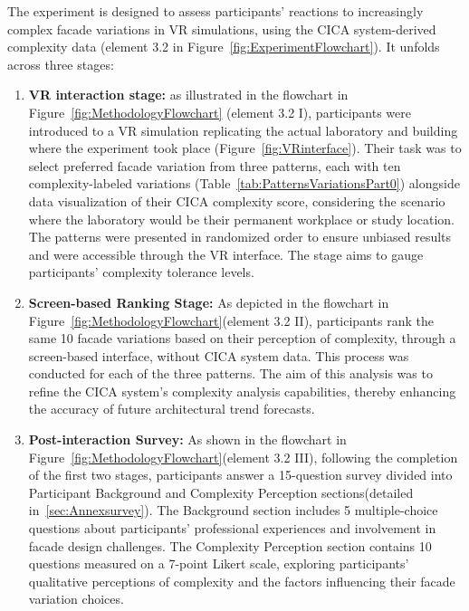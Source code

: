 %    


The experiment is designed to assess participants' reactions to increasingly complex facade variations in VR simulations, using the CICA system-derived complexity data (element 3.2 in Figure~\ref{fig:ExperimentFlowchart}). It unfolds across three stages:

\begin{enumerate}
    \item \textbf{VR interaction stage:}  as illustrated in the flowchart in Figure~\ref{fig:MethodologyFlowchart} (element 3.2 I), participants were introduced to a VR simulation replicating the actual laboratory and building where the experiment took place (Figure~\ref{fig:VRinterface}).
    Their task was to select preferred facade variation from three patterns, each with ten complexity-labeled variations (Table~\ref{tab:PatternsVariationsPart0}) alongside data visualization of their CICA complexity score, considering the scenario where the laboratory would be their permanent workplace or study location.
    The patterns were presented in randomized order to ensure unbiased results and were accessible through the VR interface.
    The stage aims to gauge participants' complexity tolerance levels.
    \item \textbf{Screen-based Ranking Stage:} As depicted in the flowchart in Figure~\ref{fig:MethodologyFlowchart}(element 3.2 II), participants rank the same 10 facade variations based on their perception of complexity, through a screen-based interface, without CICA system data.
    This process was conducted for each of the three patterns.
    The aim of this analysis was to refine the CICA system's complexity analysis capabilities, thereby enhancing the accuracy of future architectural trend forecasts.
    \item \textbf{Post-interaction Survey:} As shown in the flowchart in Figure~\ref{fig:MethodologyFlowchart}(element 3.2 III), following the completion of the first two stages, participants answer a 15-question survey divided into Participant Background and Complexity Perception sections(detailed in~\ref{sec:Annexsurvey}).
    The Background section includes 5 multiple-choice questions about participants' professional experiences and involvement in facade design challenges.
    The Complexity Perception section contains 10 questions measured on a 7-point Likert scale, exploring participants' qualitative perceptions of complexity and the factors influencing their facade variation choices.
\end{enumerate}

